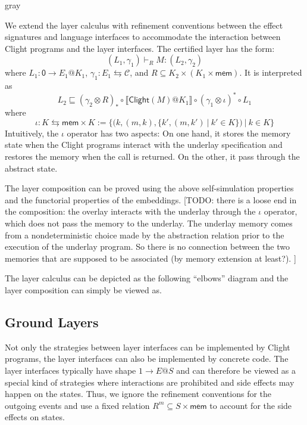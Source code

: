 \documentclass[sigplan,10pt,review,anonymous]{acmart}
\newcommand{\kw}[1]{\ensuremath{ \mathsf{#1} }}
\begin{document}
\begin{color}{gray}

We extend the layer calculus with refinement conventions between the effect
signatures and language interfaces to accommodate the interaction between Clight
programs and the layer interfaces. The certified layer has the form:
\[
  (L_1, \gamma_1) \vdash_{R} M : (L_2, \gamma_2)
\]
where $L_1 : \kw{0} \rightarrow E_1 @ K_1$,
$\gamma_1 : E_1 \leftrightarrows \mathcal{C}$, and
$R \subseteq K_2 \times (K_1 \times \mathsf{mem})$. It is interpreted as
\[
  L_2 \sqsubseteq (\gamma_2 \otimes R)_*
  \circ \llbracket \kw{Clight}(M)@K_1 \rrbracket
  \circ (\gamma_1 \otimes \iota)^* \circ L_1
\]
where
\[
  \iota : K \leftrightarrows \mathsf{mem} \times K :=
  \{(k, (m, k), \{k', (m, k') \ |\ k' \in K \})\ |\ k \in K \}
\]
Intuitively, the $\iota$ operator has two aspects: On one hand, it stores the
memory state when the Clight programs interact with the underlay specification
and restores the memory when the call is returned. On the other, it pass through
the abstract state.

The layer composition can be proved using the above self-simulation properties
and the functorial properties of the embeddings. [TODO: there is a loose end in
the composition: the overlay interacts with the underlay through the $\iota$
operator, which does not pass the memory to the underlay. The underlay memory
comes from a nondeterministic choice made by the abstraction relation prior to
the execution of the underlay program. So there is no connection between the two
memories that are supposed to be associated (by memory extension at least?). ]

The layer calculus can be depicted as the following ``elbows'' diagram and the layer
composition can simply be viewed as.
  
\end{color}

\subsection{Ground Layers}

Not only the strategies between layer interfaces can be implemented by Clight
programs, the layer interfaces can also be implemented by concrete code. The
layer interfaces typically have shape $1 \rightarrow E@S$ and can therefore be
viewed as a special kind of strategies where interactions are prohibited and
side effects may happen on the states. Thus, we ignore the refinement
conventions for the outgoing events and use a fixed relation
$R^m \subseteq S \times \kw{mem}$ to account for the side effects on states.
\end{document}
